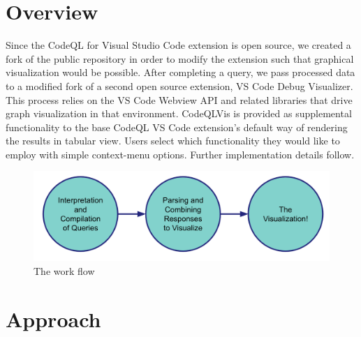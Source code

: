 \documentclass[sigplan,10pt,review]{acmart}
\begin{document}
\section{Overview}
Since the CodeQL for Visual Studio Code extension is open source, we created a fork of the public repository in order to modify the extension such that graphical visualization would be possible. After completing a query, we pass processed data to a modified fork of a second open source extension, VS Code Debug Visualizer. This process relies on the VS Code Webview API and related libraries that drive graph visualization in that environment.
\newline
\indent CodeQLVis is provided as supplemental functionality to the base CodeQL VS Code extension's default way of rendering the results in tabular view. Users select which functionality they would like to employ with simple context-menu options. Further implementation details follow.

\begin{figure}[h]
  \centering
  \includegraphics[width=\linewidth]{work_flow}
  \caption{The work flow}
\end{figure}

\section{Approach}
\end{document}

